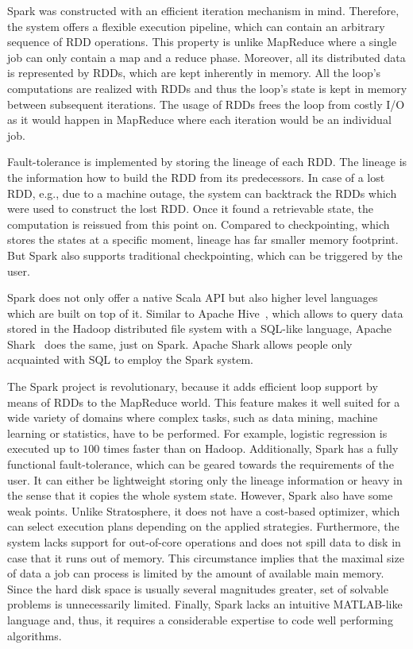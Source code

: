 Spark was constructed with an efficient iteration mechanism in mind.
Therefore, the system offers a flexible execution pipeline, which can contain an arbitrary sequence of RDD operations.
This property is unlike MapReduce where a single job can only contain a map and a reduce phase.
Moreover, all its distributed data is represented by RDDs, which are kept inherently in memory.
All the loop's computations are realized with RDDs and thus the loop's state is kept in memory between subsequent iterations.
The usage of RDDs frees the loop from costly I/O as it would happen in MapReduce where each iteration would be an individual job.

Fault-tolerance is implemented by storing the lineage of each RDD.
The lineage is the information how to build the RDD from its predecessors.
In case of a lost RDD, e.g., due to a machine outage, the system can backtrack the RDDs which were used to construct the lost RDD.
Once it found a retrievable state, the computation is reissued from this point on.
Compared to checkpointing, which stores the states at a specific moment, lineage has far smaller memory footprint.
But Spark also supports traditional checkpointing, which can be triggered by the user.

Spark does not only offer a native Scala API but also higher level languages which are built on top of it.
Similar to Apache Hive~\cite{hive}, which allows to query data stored in the Hadoop distributed file system with a SQL-like language, Apache Shark~\cite{xin:2013a} does the same, just on Spark.
Apache Shark allows people only acquainted with SQL to employ the Spark system.

The Spark project is revolutionary, because it adds efficient loop support by means of RDDs to the MapReduce world.
This feature makes it well suited for a wide variety of domains where complex tasks, such as data mining, machine learning or statistics, have to be performed.
For example, logistic regression is executed up to $100$ times faster than on Hadoop.
Additionally, Spark has a fully functional fault-tolerance, which can be geared towards the requirements of the user.
It can either be lightweight storing only the lineage information or heavy in the sense that it copies the whole system state.
However, Spark also have some weak points.
Unlike Stratosphere, it does not have a cost-based optimizer, which can select execution plans depending on the applied strategies.
Furthermore, the system lacks support for out-of-core operations and does not spill data to disk in case that it runs out of memory.
This circumstance implies that the maximal size of data a job can process is limited by the amount of available main memory.
Since the hard disk space is usually several magnitudes greater, set of solvable problems is unnecessarily limited.
Finally, Spark lacks an intuitive MATLAB-like language and, thus, it requires a considerable expertise to code well performing algorithms.

